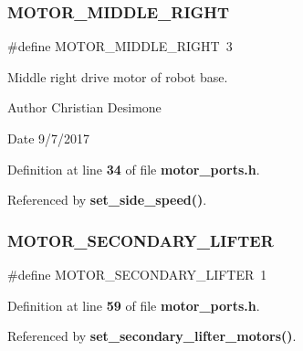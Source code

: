 \subsubsection{M\+O\+T\+O\+R\+\_\+\+M\+I\+D\+D\+L\+E\+\_\+\+R\+I\+G\+HT}
{\footnotesize\ttfamily \#define M\+O\+T\+O\+R\+\_\+\+M\+I\+D\+D\+L\+E\+\_\+\+R\+I\+G\+HT~3}



Middle right drive motor of robot base. 

\begin{DoxyAuthor}{Author}
Christian Desimone 
\end{DoxyAuthor}
\begin{DoxyDate}{Date}
9/7/2017 
\end{DoxyDate}


Definition at line \textbf{ 34} of file \textbf{ motor\+\_\+ports.\+h}.



Referenced by \textbf{ set\+\_\+side\+\_\+speed()}.

\mbox{\label{motor__ports_8h_a85596f3eea4e187ef652eac88014726f}} 
\subsubsection{M\+O\+T\+O\+R\+\_\+\+S\+E\+C\+O\+N\+D\+A\+R\+Y\+\_\+\+L\+I\+F\+T\+ER}
{\footnotesize\ttfamily \#define M\+O\+T\+O\+R\+\_\+\+S\+E\+C\+O\+N\+D\+A\+R\+Y\+\_\+\+L\+I\+F\+T\+ER~1}



Definition at line \textbf{ 59} of file \textbf{ motor\+\_\+ports.\+h}.



Referenced by \textbf{ set\+\_\+secondary\+\_\+lifter\+\_\+motors()}.

